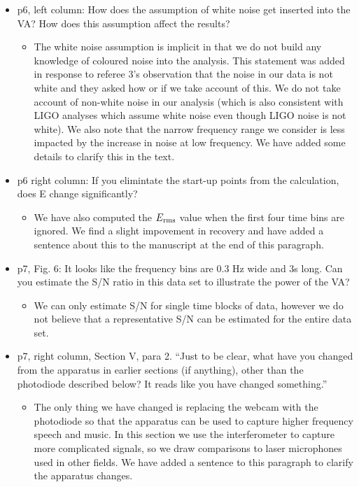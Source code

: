 \documentclass[a4paper, 10pt]{letter}
\begin{document}
\begin{itemize}
\item p6, left column: How does the assumption of white noise get inserted into the VA? How does this assumption affect the results?
\begin{itemize}
\item The white noise assumption is implicit in that we do not build any knowledge of coloured noise into the analysis. This statement was added in response to referee 3's observation that the noise in our data is not white and they asked how or if we take account of this. We do not take account of non-white noise in our analysis (which is also consistent with LIGO analyses which assume white noise even though LIGO noise is not white). We also note that the narrow frequency range we consider is less impacted by the increase in noise at low frequency. We have added some details to clarify this in the text. 
\end{itemize}

\item p6 right column: If you elimintate the start-up points from the calculation, does E change significantly?
\begin{itemize}
\item We have also computed the $E_{\rm rms}$ value when the first four time bins are ignored. We find a slight impovement in recovery and have added a sentence about this to the manuscript at the end of this paragraph. 
\end{itemize}

\item p7, Fig. 6: It looks like the frequency bins are 0.3 Hz wide and 3s long. Can you estimate the S/N ratio in this data set to illustrate the power of the VA?
\begin{itemize}
\item We can only estimate S/N for single time blocks of data, however we do not believe that a representative S/N can be estimated for the entire data set. 
\end{itemize}

\item p7, right column, Section V, para 2. ``Just to be clear, what have you changed from the apparatus in earlier sections (if anything), other than the photodiode described below? It reads like you have changed something.''
\begin{itemize}
\item The only thing we have changed is replacing the webcam with the photodiode so that the apparatus can be used to capture higher frequency speech and music. In this section we use the interferometer to capture more complicated signals, so we draw comparisons to laser microphones used in other fields. We have added a sentence to this paragraph to clarify the apparatus changes. 
\end{itemize}


\end{itemize}
\end{document}
